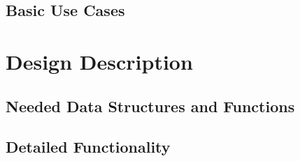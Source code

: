\subsection{Basic Use Cases}


\section{Design Description}

\subsection{Needed Data Structures and Functions}



\subsection{Detailed Functionality}

